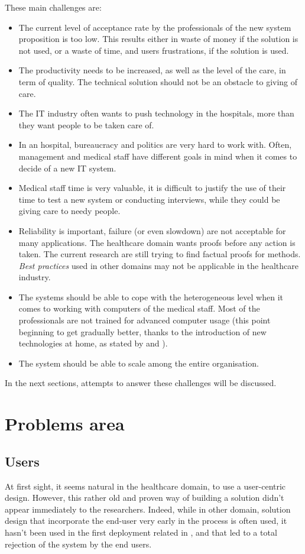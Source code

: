 \documentclass[a4paper,10pt]{article}
\begin{document}
\begin{multicols}{2}
These main challenges are:
\begin{itemize}
  \item The current level of acceptance rate by the professionals of the new
  system proposition is too low. This results either in waste of money if the %
  solution is not used, or a waste of time, and users frustrations, if the
  solution is used.
  \item The productivity needs to be increased, as well as the level of the care,
  in term of quality. The technical solution should not be an obstacle to giving %
  of care.
  \item The IT industry often wants to push technology in the hospitals, more %
  than they want people to be taken care of. %
  \item In an hospital, bureaucracy and politics are very hard to work with.
  Often, management and medical staff have different goals in mind when it    %
  comes to decide of a new IT system.
  \item Medical staff time is very valuable, it is difficult to justify the use
  of their time to test a new system or conducting interviews, while they could %
  be giving care to needy people.
  \item Reliability is important, failure (or even slowdown) are not acceptable
  for many applications. The healthcare domain wants proofs before any action is
  taken. The current research are still trying to find factual proofs for       %
  methods. \emph{Best practices} used in other domains may not be applicable
  in the healthcare industry.
  \item The systems should be able to cope with the heterogeneous level when it
  comes to working with computers of the medical staff. Most of the               %
  professionals are not trained for advanced computer usage (this point beginning
  to get gradually better, thanks to the introduction of new technologies at
  home, as stated by \cite{IndiaEMR} and \cite{UsersAward2}).
  \item The system should be able to scale among the entire organisation.
\end{itemize}

In the next sections, attempts to answer these challenges will be discussed.
\section{Problems area}

\subsection{Users}
At first sight, it seems natural in the healthcare domain, to use a user-centric
design. However, this rather old and proven way of building a solution didn't
appear immediately to the researchers. Indeed, while in other domain, solution
design that incorporate the end-user very early in the process is often used, it
hasn't been used in the first deployment related in \cite{IndiaEMR}, and
that led to a total rejection of the system by the end users.


\end{multicols}
\end{document}
